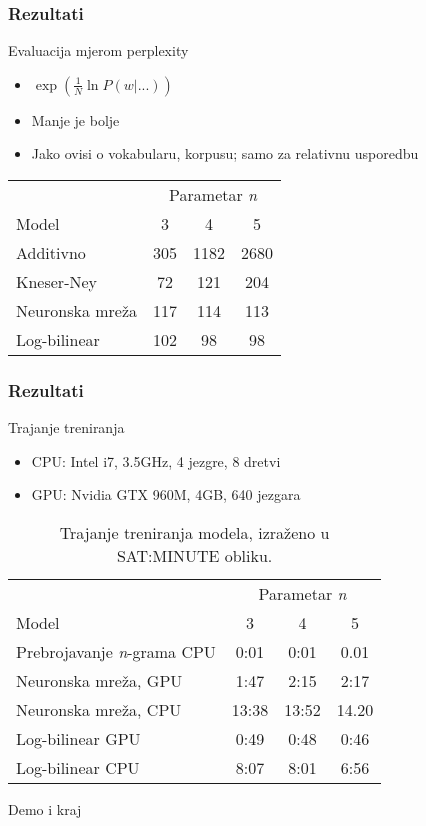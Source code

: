 \documentclass[utf8]{beamer}
\begin{document}
\begin{frame}
\frametitle{Rezultati}

	\begin{block}{Evaluacija mjerom perplexity}
	\begin{itemize}
		\item{$\exp \left( \frac{1}{N} \ln P(w | ...) \right)$}
		\item{Manje je bolje}
		\item{Jako ovisi o vokabularu, korpusu; samo za relativnu usporedbu}
	\end{itemize}
	\end{block}


	\begin{table}[htb]
	\centering
	\begin{tabular}{lccc}
	\toprule
	 & \multicolumn{3}{c}{Parametar \textit{n}} \\
	\cmidrule(r){2-4}
	Model & 3 & 4 & 5 \\
	\midrule
	Additivno &  305 & 1182 & 2680 \\
	Kneser-Ney & 72 & 121 & 204 \\
	Neuronska mreža & 117 & 114 & 113 \\
	Log-bilinear & 102 & 98 & 98 \\
	\bottomrule
	\end{tabular}
	\end{table}

\end{frame}

\begin{frame}
\frametitle{Rezultati}

	\begin{block}{Trajanje treniranja}
	\begin{itemize}
		\item{CPU: Intel i7, 3.5GHz, 4 jezgre, 8 dretvi}
		\item{GPU: Nvidia GTX 960M, 4GB, 640 jezgara}
	\end{itemize}
	\end{block}


	\begin{table}[htb]
	\caption{Trajanje treniranja modela, izraženo u SAT:MINUTE obliku.}
	\label{tbl:eval_time}
	\centering
	\begin{tabular}{lccc}
	\toprule
	 & \multicolumn{3}{c}{Parametar \textit{n}} \\
	\cmidrule(r){2-4}
	Model & 3 & 4 & 5 \\
	\midrule
	Prebrojavanje \textit{n}-grama CPU &  0:01 & 0:01 & 0.01 \\
	Neuronska mreža, GPU & 1:47 & 2:15 & 2:17 \\
	Neuronska mreža, CPU & 13:38 & 13:52 & 14.20 \\
	Log-bilinear GPU & 0:49 & 0:48 & 0:46 \\
	Log-bilinear CPU & 8:07 & 8:01 & 6:56 \\
	\bottomrule
	\end{tabular}
	\end{table}

\end{frame}

\begin{frame}

	Demo i kraj
	
\end{frame}

\end{document}
